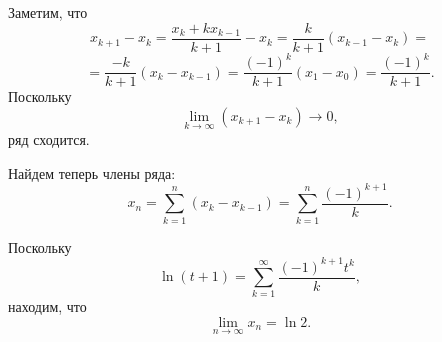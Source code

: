 \documentclass{article}
\begin{document}
Заметим, что 
$$x_{k+1} - x_k = \frac{x_k + kx_{k-1}}{k+1} - x_k = \frac{k}{k+1} (x_{k-1} - x_k) = $$
$$ = \frac{-k}{k+1} (x_k - x_{k-1}) = \frac{(-1)^k}{k+1} (x_1 - x_0) = \frac{(-1)^k}{k+1}.$$
Поскольку
$$\lim_{k \to \infty} (x_{k+1} - x_k) \to 0,$$
ряд сходится.

Найдем теперь члены ряда:
$$x_n = \sum_{k=1}^n (x_k - x_{k-1}) = \sum_{k=1}^n \frac{(-1)^{k+1}}{k}.$$

Поскольку 
$$\ln(t + 1) = \sum_{k=1}^\infty \frac{(-1)^{k+1}t^k}{k},$$
находим, что
$$\lim_{n \to \infty} x_n = \ln 2.$$
\end{document}
